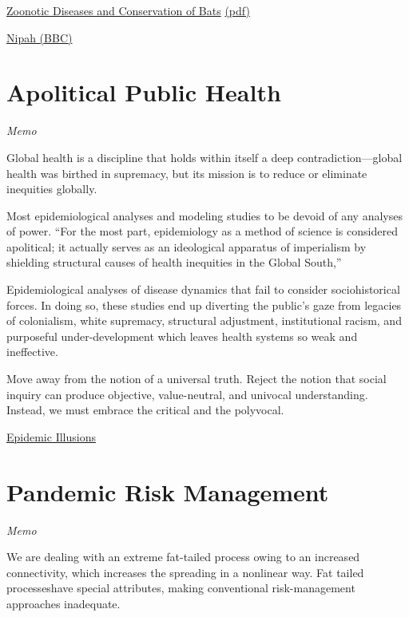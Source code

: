 \documentclass[
]{book}
\begin{document}
\href{https://www.researchgate.net/publication/286449572\%20_Zoonotic_Viruses_and_Conservation_of_Bats}{Zoonotic Diseases and Conservation of Bats}
\href{/pdf/Schneeberger_Voigt_2016_Bats_Zoonotic.pdf}{(pdf)}

\href{https://www.bbc.com/future/article/20210106-nipah-virus-how-bats-could-cause-the-\%20next-pandemic}{Nipah (BBC)}

\hypertarget{apolitical-public-health}{%
\section{Apolitical Public Health}\label{apolitical-public-health}}

\emph{Memo}

Global health is a discipline that holds within itself a deep contradiction---global health was birthed in supremacy, but its mission is to reduce or eliminate inequities globally.

Most epidemiological analyses and modeling studies to be devoid of any analyses of power. ``For the most part, epidemiology as a method of science is considered apolitical; it actually serves as an ideological apparatus of imperialism by shielding structural causes of health inequities in the Global South,''

Epidemiological analyses of disease dynamics that fail to consider sociohistorical forces. In doing so, these studies end up diverting the public's gaze from legacies of colonialism, white supremacy, structural adjustment, institutional racism, and purposeful under-development which leaves health systems so weak and ineffective.

Move away from the notion of a universal truth.
Reject the notion that social inquiry can produce objective, value-neutral, and univocal understanding. Instead, we must embrace the critical and the polyvocal.

\href{https://naturemicrobiologycommunity.nature.com/posts/a-mind-bending-take-on-the-coloniality-of-global-public-health}{Epidemic Illusions}

\hypertarget{pandemic-risk-management}{%
\section{Pandemic Risk Management}\label{pandemic-risk-management}}

\emph{Memo}

We are dealing with an extreme fat-tailed process owing to an increased connectivity,
which increases the spreading in a nonlinear way.
Fat tailed processeshave special attributes, making conventional risk-management
approaches inadequate.
\end{document}
